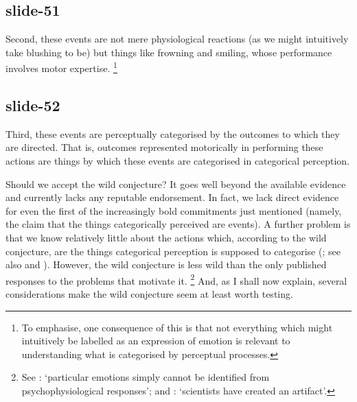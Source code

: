 \documentclass[12pt,\papersize]{extarticle}
\begin{document}
\subsection{slide-51}
Second, these events are not mere physiological reactions (as we might intuitively take blushing to be) but things like frowning and smiling, whose performance involves motor expertise.
\footnote{
To emphasise, one consequence of this is that not everything which might intuitively be labelled as an expression of emotion is relevant to understanding what is categorised by perceptual processes.
}

\subsection{slide-52}
Third, these events are perceptually categorised  by the outcomes to which they are directed.
That is, outcomes represented motorically in performing these actions are things by which these events are categorised in categorical perception.

Should we accept the wild conjecture?
It goes well beyond the available evidence and currently lacks any reputable endorsement.
In fact, we lack direct evidence for even the first of the increasingly bold commitments just mentioned (namely, the claim that the things categorically perceived are events).
A further problem is that we know relatively little about the actions which, according to the wild conjecture, are the things categorical perception is supposed to categorise  (\citealp[p.\ 47]{scherer:2013_understanding}; see also \citealp{scherer:2007_are} and \citealp{fernandez-dols:2013_advances}).
However,
the wild conjecture is less wild than the only published responses to the problems that motivate it.%
\footnote{
See
\citet[p.\ 15]{motley:1988_facial}: ‘particular emotions simply cannot be identified from psychophysiological responses’;
and
\citet[p.\ 289]{barrett:2011_context}: ‘scientists have created an artifact’.
}
And, as I shall now explain, several considerations make the wild conjecture seem at least worth testing.
\end{document}
